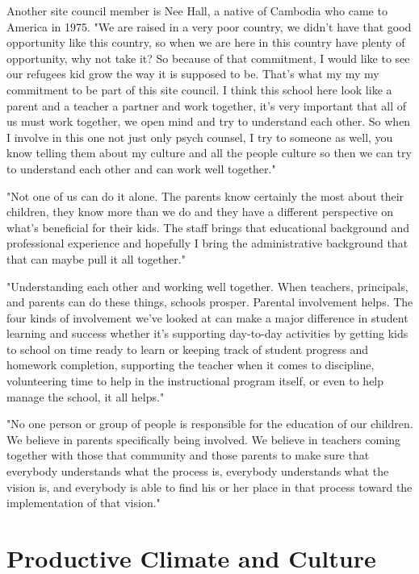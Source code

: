 Another site council member is Nee Hall, a native of Cambodia who came to America in 1975.
"We are raised in a very poor country, we didn't have that good opportunity like this country, so when we are here in this country have plenty of opportunity, why not take it?
So because of that commitment, I would like to see our refugees kid grow the way it is supposed to be.
That's what my my my commitment to be part of this site council.
I think this school here look like a parent and a teacher a partner and work together, it's very important that all of us must work together, we open mind and try to understand each other.
So when I involve in this one not just only psych counsel, I try to someone as well, you know telling them about my culture and all the people culture so then we can try to understand each other and can work well together."

"Not one of us can do it alone.
The parents know certainly the most about their children, they know more than we do and they have a different perspective on what's beneficial for their kids.
The staff brings that educational background and professional experience and hopefully I bring the administrative background that that can maybe pull it all together."

"Understanding each other and working well together.
When teachers, principals, and parents can do these things, schools prosper.
Parental involvement helps.
The four kinds of involvement we've looked at can make a major difference in student learning and success whether it's supporting day-to-day activities by getting kids to school on time ready to learn or keeping track of student progress and homework completion, supporting the teacher when it comes to discipline, volunteering time to help in the instructional program itself, or even to help manage the school, it all helps."

"No one person or group of people is responsible for the education of our children.
We believe in parents specifically being involved.
We believe in teachers coming together with those that community and those parents to make sure that everybody understands what the process is, everybody understands what the vision is, and everybody is able to find his or her place in that process toward the implementation of that vision."


\section{Productive Climate and Culture}

